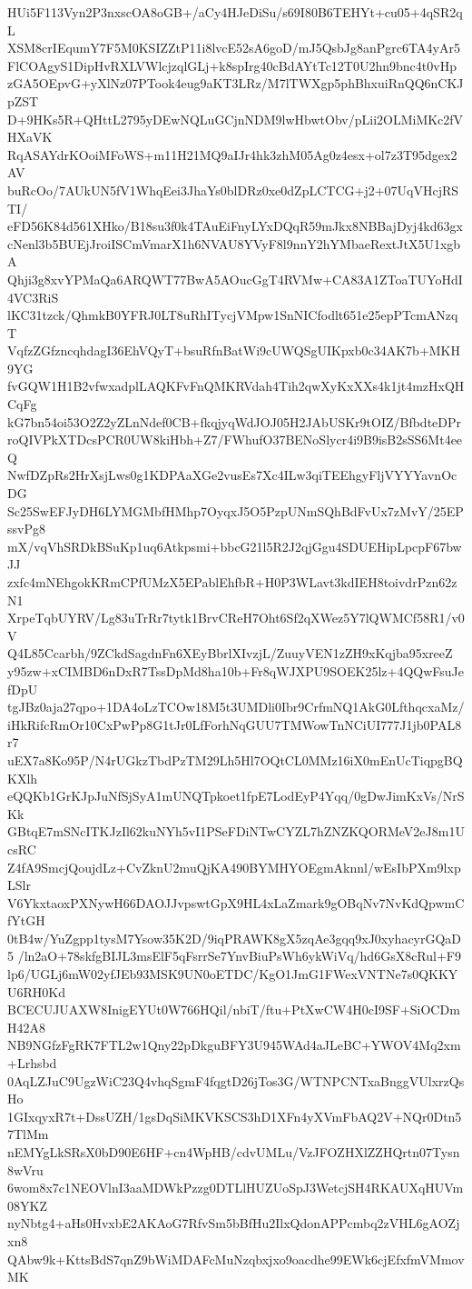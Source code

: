 HUi5F113Vyn2P3nxscOA8oGB+/aCy4HJeDiSu/s69I80B6TEHYt+cu05+4qSR2qL
XSM8crIEqumY7F5M0KSIZZtP11i8lvcE52sA6goD/mJ5QsbJg8anPgrc6TA4yAr5
FlCOAgyS1DipHvRXLVWlcjzqlGLj+k8spIrg40cBdAYtTc12T0U2hn9bnc4t0vHp
zGA5OEpvG+yXlNz07PTook4eug9aKT3LRz/M7lTWXgp5phBhxuiRnQQ6nCKJpZST
D+9HKs5R+QHttL2795yDEwNQLuGCjnNDM9lwHbwtObv/pLii2OLMiMKc2fVHXaVK
RqASAYdrKOoiMFoWS+m11H21MQ9aIJr4hk3zhM05Ag0z4esx+ol7z3T95dgex2AV
buRcOo/7AUkUN5fV1WhqEei3JhaYs0blDRz0xe0dZpLCTCG+j2+07UqVHcjRSTI/
eFD56K84d561XHko/B18su3f0k4TAuEiFnyLYxDQqR59mJkx8NBBajDyj4kd63gx
cNenl3b5BUEjJroiISCmVmarX1h6NVAU8YVyF8l9nnY2hYMbaeRextJtX5U1xgbA
Qhji3g8xvYPMaQa6ARQWT77BwA5AOucGgT4RVMw+CA83A1ZToaTUYoHdI4VC3RiS
lKC31tzck/QhmkB0YFRJ0LT8uRhITycjVMpw1SnNICfodlt651e25epPTcmANzqT
VqfzZGfzncqhdagI36EhVQyT+bsuRfnBatWi9cUWQSgUIKpxb0c34AK7b+MKH9YG
fvGQW1H1B2vfwxadplLAQKFvFnQMKRVdah4Tih2qwXyKxXXs4k1jt4mzHxQHCqFg
kG7bn54oi53O2Z2yZLnNdef0CB+fkqjyqWdJOJ05H2JAbUSKr9tOIZ/BfbdteDPr
roQIVPkXTDcsPCR0UW8kiHbh+Z7/FWhufO37BENoSlycr4i9B9isB2sSS6Mt4eeQ
NwfDZpRs2HrXsjLws0g1KDPAaXGe2vusEs7Xc4ILw3qiTEEhgyFljVYYYavnOcDG
Sc25SwEFJyDH6LYMGMbfHMhp7OyqxJ5O5PzpUNmSQhBdFvUx7zMvY/25EPssvPg8
mX/vqVhSRDkBSuKp1uq6Atkpsmi+bbcG21l5R2J2qjGgu4SDUEHipLpcpF67bwJJ
zxfc4mNEhgokKRmCPfUMzX5EPablEhfbR+H0P3WLavt3kdIEH8toivdrPzn62zN1
XrpeTqbUYRV/Lg83uTrRr7tytk1BrvCReH7Oht6Sf2qXWez5Y7lQWMCf58R1/v0V
Q4L85Ccarbh/9ZCkdSagdnFn6XEyBbrlXIvzjL/ZuuyVEN1zZH9xKqjba95xreeZ
y95zw+xCIMBD6nDxR7TssDpMd8ha10b+Fr8qWJXPU9SOEK25lz+4QQwFsuJefDpU
tgJBz0aja27qpo+1DA4oLzTCOw18M5t3UMDli0Ibr9CrfmNQ1AkG0LfthqcxaMz/
iHkRifcRmOr10CxPwPp8G1tJr0LfForhNqGUU7TMWowTnNCiUI777J1jb0PAL8r7
uEX7a8Ko95P/N4rUGkzTbdPzTM29Lh5Hl7OQtCL0MMz16iX0mEnUcTiqpgBQKXlh
eQQKb1GrKJpJuNfSjSyA1mUNQTpkoet1fpE7LodEyP4Yqq/0gDwJimKxVs/NrSKk
GBtqE7mSNcITKJzIl62kuNYh5vI1PSeFDiNTwCYZL7hZNZKQORMeV2eJ8m1UcsRC
Z4fA9SmcjQoujdLz+CvZknU2muQjKA490BYMHYOEgmAknnl/wEsIbPXm9lxpLSlr
V6YkxtaoxPXNywH66DAOJJvpswtGpX9HL4xLaZmark9gOBqNv7NvKdQpwmCfYtGH
0tB4w/YuZgpp1tysM7Ysow35K2D/9iqPRAWK8gX5zqAe3gqq9xJ0xyhacyrGQaD5
/ln2aO+78skfgBIJL3msElF5qFsrrSe7YnvBiuPsWh6ykWiVq/hd6GsX8cRul+F9
lp6/UGLj6mW02yfJEb93MSK9UN0oETDC/KgO1JmG1FWexVNTNe7s0QKKYU6RH0Kd
BCECUJUAXW8InigEYUt0W766HQil/nbiT/ftu+PtXwCW4H0cI9SF+SiOCDmH42A8
NB9NGfzFgRK7FTL2w1Qny22pDkguBFY3U945WAd4aJLeBC+YWOV4Mq2xm+Lrhsbd
0AqLZJuC9UgzWiC23Q4vhqSgmF4fqgtD26jTos3G/WTNPCNTxaBnggVUlxrzQsHo
1GIxqyxR7t+DssUZH/1gsDqSiMKVKSCS3hD1XFn4yXVmFbAQ2V+NQr0Dtn57TlMm
nEMYgLkSRsX0bD90E6HF+cn4WpHB/cdvUMLu/VzJFOZHXlZZHQrtn07Tysn8wVru
6wom8x7c1NEOVlnI3aaMDWkPzzg0DTLlHUZUoSpJ3WetcjSH4RKAUXqHUVm08YKZ
nyNbtg4+aHs0HvxbE2AKAoG7RfvSm5bBfHu2IlxQdonAPPcmbq2zVHL6gAOZjxn8
QAbw9k+KttsBdS7qnZ9bWiMDAFcMuNzqbxjxo9oacdhe99EWk6cjEfxfmVMmovMK
